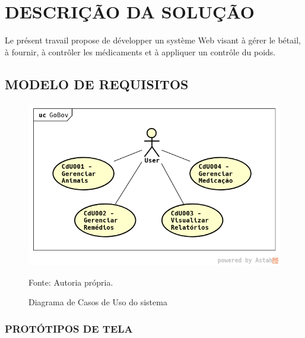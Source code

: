 %
%


\chapter{\textbf{DESCRIÇÃO DA SOLUÇÃO}}\label{chap:descSolucao}

Le présent travail propose de développer un système Web visant à gérer le bétail, à fournir, à contrôler les médicaments et à appliquer un contrôle du poids.

\section{MODELO DE REQUISITOS}

\begin{figure}[H]
	\begin{center}
		\caption{Diagrama de Casos de Uso do sistema}
		\includegraphics[width=6in]{../img/casosdeuso.png}

		Fonte: Autoria própria.
	\end{center}
\end{figure}

\subsection{PROTÓTIPOS DE TELA}


